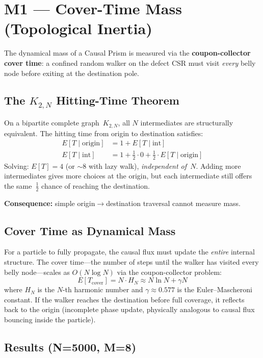 \documentclass[11pt, a4paper, openany]{book}
\begin{document}
\section{M1 --- Cover-Time Mass (Topological Inertia)}

The dynamical mass of a Causal Prism is measured via the
\textbf{coupon-collector cover time}: a confined random walker on the defect CSR
must visit \emph{every} belly node before exiting at the destination pole.

\subsection{The $K_{2,N}$ Hitting-Time Theorem}

On a bipartite complete graph~$K_{2,N}$, all $N$ intermediates are structurally
equivalent.  The hitting time from origin to destination satisfies:
\begin{align}
  E[T \mid \text{origin}] &= 1 + E[T \mid \text{int}] \\
  E[T \mid \text{int}]    &= 1 + \tfrac{1}{2} \cdot 0
                                 + \tfrac{1}{2} \cdot E[T \mid \text{origin}]
\end{align}
Solving: $E[T] = 4$ (or $\sim 8$ with lazy walk), \emph{independent of~$N$}.
Adding more intermediates gives more choices at the origin, but each intermediate
still offers the same~$\frac{1}{2}$ chance of reaching the destination.

\textbf{Consequence:} simple origin$\to$destination traversal cannot measure mass.

\subsection{Cover Time as Dynamical Mass}

For a particle to fully propagate, the causal flux must update the
\emph{entire} internal structure.  The cover time---the number of steps until the
walker has visited every belly node---scales as $O(N \log N)$ via the
coupon-collector problem:
\[
  E[T_{\text{cover}}] = N \cdot H_N \approx N \ln N + \gamma N
\]
where $H_N$ is the $N$-th harmonic number and $\gamma \approx 0.577$ is the
Euler--Mascheroni constant.  If the walker reaches the destination before full
coverage, it reflects back to the origin (incomplete phase update, physically
analogous to causal flux bouncing inside the particle).

\subsection{Results (N=5000, M=8)}
\end{document}
